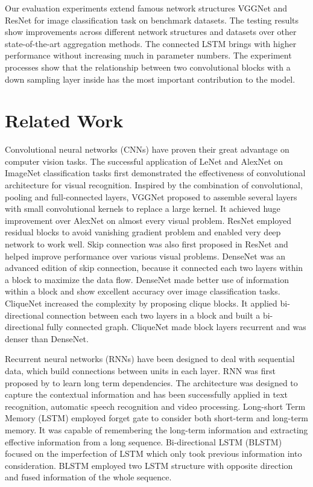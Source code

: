 \documentclass[conference]{IEEEtran}
\begin{document}
Our evaluation experiments extend famous network structures VGGNet\cite{vgg} and ResNet\cite{resnet} for image classification task on benchmark datasets. The testing results show improvements across different network structures and datasets over other state-of-the-art aggregation methods. The connected LSTM brings with higher performance without increasing much in parameter numbers. The experiment processes show that the relationship between two convolutional blocks with a down sampling layer inside has the most important contribution to the model.




\section{Related Work}
Convolutional neural networks (CNNs) have proven their great advantage on computer vision tasks. The successful application of LeNet\cite{lenet} and AlexNet\cite{alexnet} on ImageNet\cite{imagenet} classification tasks first demonstrated the effectiveness of convolutional architecture for visual recognition. Inspired by the combination of convolutional, pooling and full-connected layers, VGGNet\cite{vgg} proposed to assemble several layers with small convolutional kernels to replace a large kernel. It achieved huge improvement over AlexNet on almost every visual problem. ResNet\cite{resnet} employed residual blocks to avoid vanishing gradient problem and enabled very deep network to work well. Skip connection was also first proposed in ResNet and helped improve performance over various visual problems. DenseNet\cite{densenet} was an advanced edition of skip connection, because it connected each two layers within a block to maximize the data flow. DenseNet made better use of information within a block and show excellent accuracy over image classification tasks. CliqueNet\cite{cliquenet} increased the complexity by proposing clique blocks. It applied bi-directional connection between each two layers in a block and built a bi-directional fully connected graph. CliqueNet made block layers recurrent and was denser than DenseNet.



Recurrent neural networks (RNNs) have been designed to deal with sequential data, which build connections between units in each layer. RNN was first proposed by \cite{rnn} to learn long term dependencies. The architecture was designed to capture the contextual information and has been successfully applied in text recognition\cite{text_rnn}, automatic speech recognition\cite{speech_rnn} and video processing\cite{video_rnn}. Long-short Term Memory (LSTM)\cite{lstm} employed forget gate to consider both short-term and long-term memory.  It was capable of remembering the long-term information and extracting effective information from a long sequence. Bi-directional LSTM (BLSTM)\cite{blstm} focused on the imperfection of LSTM which only took previous information into consideration. BLSTM employed two LSTM structure with opposite direction and fused information of the whole sequence.
\end{document}
